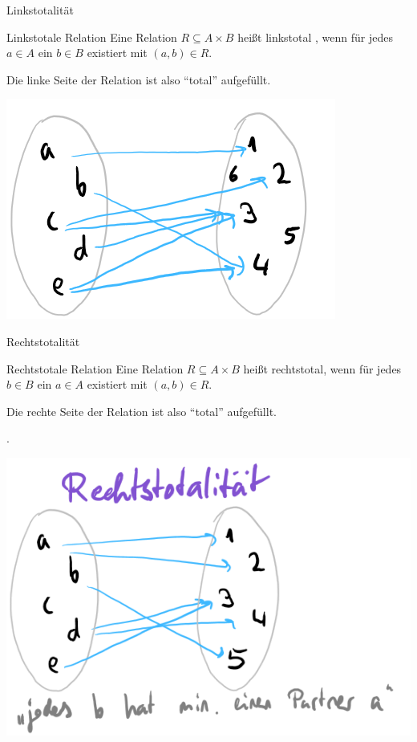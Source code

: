 \documentclass{beamer}
\begin{document}
\begin{frame}{Linkstotalität}
	\begin{block}{Linkstotale Relation}
		Eine Relation $R \subseteq A \times B$ heißt linkstotal  , wenn für jedes $a \in A$ ein $b \in B$ existiert mit $(a,b) \in R$.
	\end{block} 
	
	Die linke Seite der Relation ist also ``total'' aufgefüllt. 
	
	\begin{center}
		\includegraphics[width=.5\linewidth]{../images/mengen_linkstotal.png}
	\end{center}
\end{frame}

\begin{frame}{Rechtstotalität}
	\begin{block}{Rechtstotale Relation}
		Eine Relation $R \subseteq A \times B$ heißt rechtstotal, wenn für jedes $b \in B$ ein $a \in A$ existiert mit $(a,b) \in R$.
	\end{block} 
	
	Die rechte Seite der Relation ist also ``total'' aufgefüllt. 
	
	 . 
	
	\begin{center}
		\includegraphics[width=.5\linewidth]{../images/mengen_rechtstotal.png}
	\end{center}
\end{frame}
\end{document}
